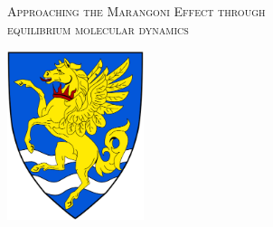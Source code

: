 \begin{titlepage}

\begin{center}
\linespread{1.3}
\textsc{\LARGE Approaching the Marangoni Effect through\\}
\textsc{\LARGE equilibrium molecular dynamics\\}
\vfill
{}

\vfill 

\includegraphics[width=0.3\textwidth]{Robinson_College_Crest.png}

\vfill 

\end{center}
\end{titlepage}
